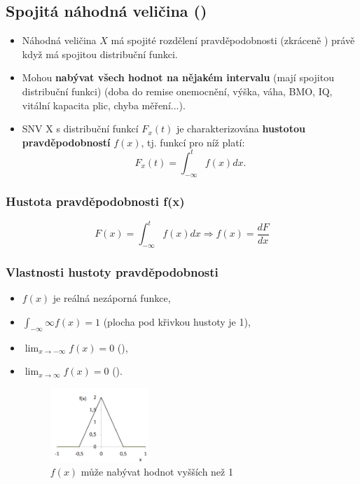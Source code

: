 \subsection{Spojitá náhodná veličina ()}

\begin{itemize}
		\item Náhodná veličina $X$ má spojité rozdělení pravděpodobnosti (zkráceně ) právě když má spojitou distribuční funkci.
		\item Mohou \textbf{nabývat všech hodnot na nějakém intervalu} (mají spojitou distribuční funkci) (doba do remise onemocnění, výška, váha, BMO, IQ, vitální kapacita plic, chyba měření...).
		\item SNV X s distribuční funkcí $F_x(t)$ je charakterizována \textbf{hustotou pravděpodobností} $f(x)$, tj. funkcí pro níž platí:
		\begin{equation*}
				F_x(t) = \int_{-\infty}^{t} f(x) dx.
		\end{equation*}
	\end{itemize}
\subsubsection{Hustota pravděpodobnosti f(x)}
\begin{equation*}
F(x) = \int_{-\infty}^{t} f(x) dx \Rightarrow f(x) = \frac{dF}{dx}
\end{equation*}
\subsubsection*{Vlastnosti hustoty pravděpodobnosti}
\begin{itemize}
	\item $f(x)$ je reálná nezáporná funkce,
	\item $\int_{-\infty}{\infty} f(x) = 1$ (plocha pod křivkou hustoty je 1), 
	\item $\lim_{x \to -\infty} f(x) = 0$ (),
	\item $\lim_{x \to \infty} f(x) = 0$ ().
	\begin{figure}[H]
		\centering
		\includegraphics[width=0.35\textwidth]{assets/11_snv_muze}
		\caption{$f(x)$ může nabývat hodnot vyšších než 1}
	\end{figure}
\end{itemize}
